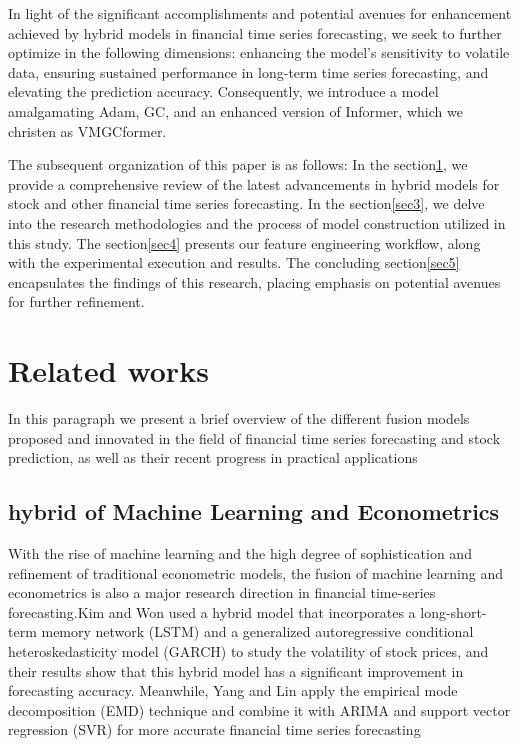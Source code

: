 \documentclass[sn-mathphys,Numbered]{sn-jnl}
\theoremstyle{thmstyleone}%
\theoremstyle{thmstyletwo}%
\theoremstyle{thmstylethree}%
\begin{document}
In light of the significant accomplishments and potential avenues for enhancement achieved by hybrid models in financial time series forecasting, we seek to further optimize in the following dimensions: enhancing the model's sensitivity to volatile data, ensuring sustained performance in long-term time series forecasting, and elevating the prediction accuracy. Consequently, we introduce a model amalgamating Adam, GC, and an enhanced version of Informer, which we christen as VMGCformer.

The subsequent organization of this paper is as follows: In the section\ref{sec2}, we provide a comprehensive review of the latest advancements in hybrid models for stock and other financial time series forecasting. In the section\ref{sec3}, we delve into the research methodologies and the process of model construction utilized in this study. The section\ref{sec4} presents our feature engineering workflow, along with the experimental execution and results. The concluding section\ref{sec5} encapsulates the findings of this research, placing emphasis on potential avenues for further refinement.

\section{Related works}\label{sec2}
In this paragraph we present a brief overview of the different fusion models proposed and innovated in the field of financial time series forecasting and stock prediction, as well as their recent progress in practical applications
\subsection{hybrid of Machine Learning and Econometrics}\label{sec2.1}

With the rise of machine learning and the high degree of sophistication and refinement of traditional econometric models, the fusion of machine learning and econometrics is also a major research direction in financial time-series forecasting.Kim and Won used a hybrid model that incorporates a long-short-term memory network (LSTM) and a generalized autoregressive conditional heteroskedasticity model (GARCH) to study the volatility of stock prices\cite{ kim2018forecasting}, and their results show that this hybrid model has a significant improvement in forecasting accuracy. Meanwhile, Yang and Lin apply the empirical mode decomposition (EMD) technique and combine it with ARIMA and support vector regression (SVR) for more accurate financial time series forecasting\cite{yang2016integrated}
\end{document}
